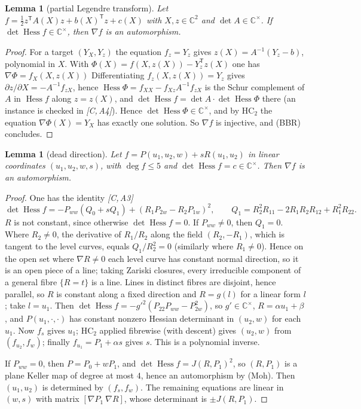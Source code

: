 \documentclass[11pt]{article}
\newtheorem{lemma}[theorem]{Lemma}
\theoremstyle{remark}
\newcommand{\C}{\mathbb{C}}
\newcommand{\Hess}{\operatorname{Hess}}
\newcommand{\HC}{\mathrm{HC}}
\newcommand{\cert}[1]{\emph{[C,\,#1]}}
\begin{document}
\begin{lemma}[partial Legendre transform]\label{lem:Leg}
Let $f=\frac12 z^{\mathsf T}A(X)z+b(X)^{\mathsf T}z+c(X)$ with $X,z\in\C^2$ and $\det A\in\C^\times$. If $\det\Hess f\in\C^\times$, then $\nabla f$ is an automorphism.
\end{lemma}
\begin{proof}
For a target $(Y_X,Y_z)$ the equation $f_z=Y_z$ gives $z(X)=A^{-1}(Y_z-b)$, polynomial in $X$. With $\Phi(X)=f(X,z(X))-Y_z^{\mathsf T}z(X)$ one has $\nabla\Phi=f_X(X,z(X))$ Differentiating $f_z(X,z(X))=Y_z$ gives $\partial z/\partial X=-A^{-1}f_{zX}$, hence $\Hess\Phi=f_{XX}-f_{Xz}A^{-1}f_{zX}$ is the Schur complement of $A$ in $\Hess f$ along $z=z(X)$, and $\det\Hess f=\det A\cdot\det\Hess\Phi$ there (an instance is checked in \cert{A4}). Hence $\det\Hess\Phi\in\C^\times$, and by $\HC_2$ the equation $\nabla\Phi(X)=Y_X$ has exactly one solution. So $\nabla f$ is injective, and (BBR) concludes.
\end{proof}

\begin{lemma}[dead direction]\label{lem:K}
Let $f=P(u_1,u_2,w)+sR(u_1,u_2)$ in linear coordinates $(u_1,u_2,w,s)$, with $\deg f\le5$ and $\det\Hess f=c\in\C^\times$. Then $\nabla f$ is an automorphism.
\end{lemma}
\begin{proof}
One has the identity \cert{A3}
\[\det\Hess f=-P_{ww}(Q_0+sQ_1)+(R_1P_{2w}-R_2P_{1w})^2,\qquad Q_1=R_2^2R_{11}-2R_1R_2R_{12}+R_1^2R_{22}.\]
$R$ is not constant, since otherwise $\det\Hess f=0$. If $P_{ww}\ne0$, then $Q_1=0$. Where $R_2\ne0$, the derivative of $R_1/R_2$ along the field $(R_2,-R_1)$, which is tangent to the level curves, equals $Q_1/R_2^2=0$ (similarly where $R_1\ne0$). Hence on the open set where $\nabla R\ne0$ each level curve has constant normal direction, so it is an open piece of a line; taking Zariski closures, every irreducible component of a general fibre $\{R=t\}$ is a line. Lines in distinct fibres are disjoint, hence parallel, so $R$ is constant along a fixed direction and $R=g(l)$ for a linear form $l$; take $l=u_1$. Then $\det\Hess f=-g'^2(P_{22}P_{ww}-P_{2w}^2)$, so $g'\in\C^\times$, $R=\alpha u_1+\beta$, and $P(u_1,\cdot,\cdot)$ has constant nonzero Hessian determinant in $(u_2,w)$ for each $u_1$. Now $f_s$ gives $u_1$; $\HC_2$ applied fibrewise (with descent) gives $(u_2,w)$ from $(f_{u_2},f_w)$; finally $f_{u_1}=P_1+\alpha s$ gives $s$. This is a polynomial inverse.

If $P_{ww}=0$, then $P=P_0+wP_1$, and $\det\Hess f=J(R,P_1)^2$, so $(R,P_1)$ is a plane Keller map of degree at most $4$, hence an automorphism by (Moh). Then $(u_1,u_2)$ is determined by $(f_s,f_w)$. The remaining equations are linear in $(w,s)$ with matrix $[\nabla P_1\ \nabla R]$, whose determinant is $\pm J(R,P_1)$.
\end{proof}
\end{document}

